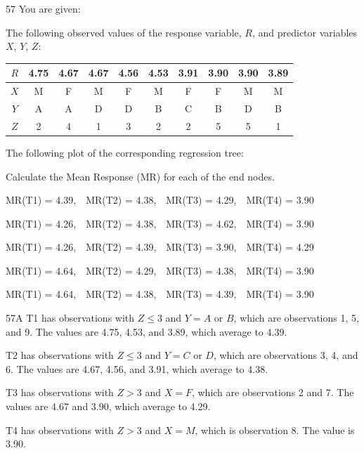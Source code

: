 \begin{question}{57}
You are given:
\begin{given}
\item The following observed values of the response variable, $R$, and predictor variables $X$, $Y$, $Z$:
\begin{center}
\begin{tabular}{|c|c|c|c|c|c|c|c|c|c|}
\hline
$R$ & 4.75 & 4.67 & 4.67 & 4.56 & 4.53 & 3.91 & 3.90 & 3.90 & 3.89 \\ \hline
$X$ & M & F & M & F & M & F & F & M & M \\ \hline
$Y$ & A & A & D & D & B & C & B & D & B \\ \hline
$Z$ & 2 & 4 & 1 & 3 & 2 & 2 & 5 & 5 & 1 \\ \hline
\end{tabular}
\end{center}
\item The following plot of the corresponding regression tree:
\end{given}

Calculate the Mean Response (MR) for each of the end nodes.

\begin{choices}
\item MR(T1) = 4.39,\ \ MR(T2) = 4.38,\ \ MR(T3) = 4.29,\ \ MR(T4) = 3.90
\item MR(T1) = 4.26,\ \ MR(T2) = 4.38,\ \ MR(T3) = 4.62,\ \ MR(T4) = 3.90
\item MR(T1) = 4.26,\ \ MR(T2) = 4.39,\ \ MR(T3) = 3.90,\ \ MR(T4) = 4.29
\item MR(T1) = 4.64,\ \ MR(T2) = 4.29,\ \ MR(T3) = 4.38,\ \ MR(T4) = 3.90
\item MR(T1) = 4.64,\ \ MR(T2) = 4.38,\ \ MR(T3) = 4.39,\ \ MR(T4) = 3.90
\end{choices}
\end{question}
\begin{solution}{57}{A}
T1 has observations with $Z \leqslant 3$ and $Y = A$ or $B$, which are observations 1, 5, and 9. The values are 4.75, 4.53, and 3.89, which average to 4.39.

T2 has observations with $Z \leqslant 3$ and $Y = C$ or $D$, which are observations 3, 4, and 6. The values are 4.67, 4.56, and 3.91, which average to 4.38.

T3 has observations with $Z > 3$ and $X = F$, which are observations 2 and 7. The values are 4.67 and 3.90, which average to 4.29.

T4 has observations with $Z > 3$ and $X = M$, which is observation 8. The value is 3.90.
\end{solution}

